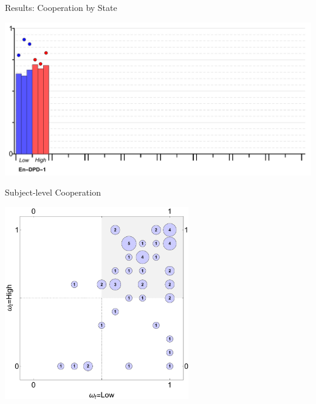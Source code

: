 \documentclass{beamer}
\begin{document}
\begin{frame}{Results: Cooperation by State}
\begin{card}
    \begin{center}
    	\includegraphics[width=1\textwidth]{./i/col_bar_StateCoop_block_EnDPD_1.pdf}
    \end{center}
\end{card}
\end{frame}

\begin{frame}{Subject-level Cooperation }
\begin{card}
    \begin{center}
    	\includegraphics[width=0.6\textwidth]{./i/col_subject_stateCooperation_L5_EnDPD_1.pdf}
    \end{center}
\end{card}
\end{frame}
\end{document}
